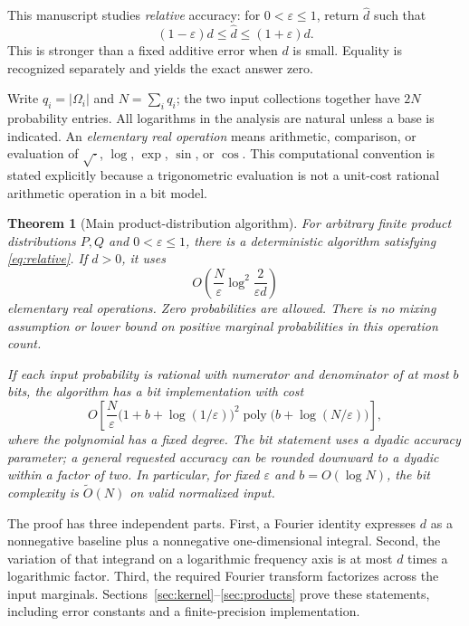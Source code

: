 \documentclass[11pt]{article}
\newtheorem{theorem}{Theorem}[section]
\theoremstyle{definition}
\theoremstyle{remark}
\newcommand{\eps}{\varepsilon}
\newcommand{\poly}{\operatorname{poly}}
\newcommand{\softO}{\widetilde O}
\begin{document}
This manuscript studies \emph{relative} accuracy: for $0<\eps\le1$, return $\widehat d$ such that
\begin{equation}
 (1-\eps)d\le\widehat d\le(1+\eps)d.
 \label{eq:relative}
\end{equation}
This is stronger than a fixed additive error when $d$ is small. Equality is recognized separately and yields the exact answer zero.

Write $q_i=|\Omega_i|$ and $N=\sum_iq_i$; the two input collections together have $2N$ probability entries. All logarithms in the analysis are natural unless a base is indicated. An \emph{elementary real operation} means arithmetic, comparison, or evaluation of $\sqrt{\cdot}$, $\log$, $\exp$, $\sin$, or $\cos$. This computational convention is stated explicitly because a trigonometric evaluation is not a unit-cost rational arithmetic operation in a bit model.

\begin{theorem}[Main product-distribution algorithm]
\label{thm:main}
For arbitrary finite product distributions $P,Q$ and $0<\eps\le1$, there is a deterministic algorithm satisfying \eqref{eq:relative}. If $d>0$, it uses
\begin{equation}
 O\!\left(\frac{N}{\eps}\log^2\frac{2}{\eps d}\right)
 \label{eq:maincost}
\end{equation}
elementary real operations. Zero probabilities are allowed. There is no mixing assumption or lower bound on positive marginal probabilities in this operation count.

If each input probability is rational with numerator and denominator of at most $b$ bits, the algorithm has a bit implementation with cost
\begin{equation}
 O\!\left[\frac{N}{\eps}
 \bigl(1+b+\log(1/\eps)\bigr)^2
 \poly\bigl(b+\log(N/\eps)\bigr)\right],
 \label{eq:bitcost}
\end{equation}
where the polynomial has a fixed degree. The bit statement uses a dyadic accuracy parameter; a general requested accuracy can be rounded downward to a dyadic within a factor of two. In particular, for fixed $\eps$ and $b=O(\log N)$, the bit complexity is $\softO(N)$ on valid normalized input.
\end{theorem}

The proof has three independent parts. First, a Fourier identity expresses $d$ as a nonnegative baseline plus a nonnegative one-dimensional integral. Second, the variation of that integrand on a logarithmic frequency axis is at most $d$ times a logarithmic factor. Third, the required Fourier transform factorizes across the input marginals. Sections~\ref{sec:kernel}--\ref{sec:products} prove these statements, including error constants and a finite-precision implementation.
\end{document}
